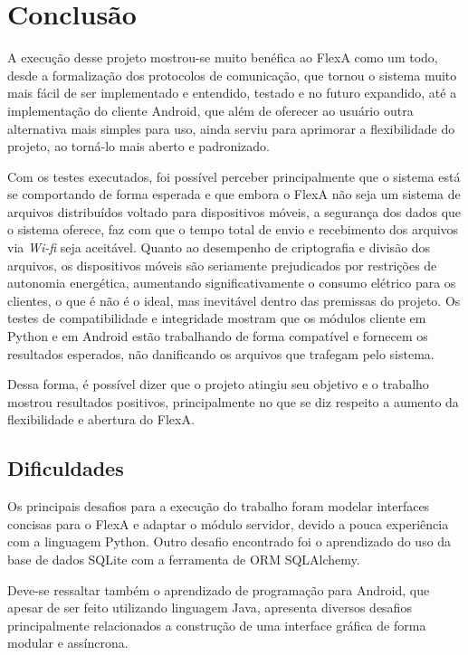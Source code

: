
\chapter{Conclusão}
\label{cap5}

    A execução desse projeto mostrou-se muito benéfica ao FlexA como um todo, desde a formalização dos protocolos de comunicação, que tornou o sistema muito mais fácil de ser implementado e entendido, testado e no futuro expandido, até a implementação do cliente Android, que além de oferecer ao usuário outra alternativa mais simples para uso, ainda serviu para aprimorar a flexibilidade do projeto, ao torná-lo mais aberto e padronizado.
    
    Com os testes executados, foi possível perceber principalmente que o sistema está se comportando de forma esperada e que embora o FlexA não seja um sistema de arquivos distribuídos voltado para dispositivos móveis, a segurança dos dados que o sistema oferece, faz com que o tempo total de envio e recebimento dos arquivos via \textit{Wi-fi} seja aceitável. Quanto ao desempenho de criptografia e divisão dos arquivos, os dispositivos móveis são seriamente prejudicados por restrições de autonomia energética, aumentando significativamente o consumo elétrico para os clientes, o que é não é o ideal, mas inevitável dentro das premissas do projeto. Os testes de compatibilidade e integridade mostram que os módulos cliente em Python e em Android estão trabalhando de forma compatível e fornecem os resultados esperados, não danificando os arquivos que trafegam pelo sistema.
    
    Dessa forma, é possível dizer que o projeto atingiu seu objetivo e o trabalho mostrou resultados positivos, principalmente no que se diz respeito a aumento da flexibilidade e abertura do FlexA.
    
    
    \section{Dificuldades}
    
    Os principais desafios para a execução do trabalho foram modelar interfaces concisas para o FlexA e adaptar o módulo servidor, devido a pouca experiência com a linguagem Python. Outro desafio encontrado foi  o aprendizado do uso da base de dados SQLite com a ferramenta de ORM SQLAlchemy.
    
    Deve-se ressaltar também o aprendizado de programação para Android, que apesar de ser feito utilizando linguagem Java, apresenta diversos desafios principalmente relacionados a construção de uma interface gráfica de forma modular e assíncrona.
    
